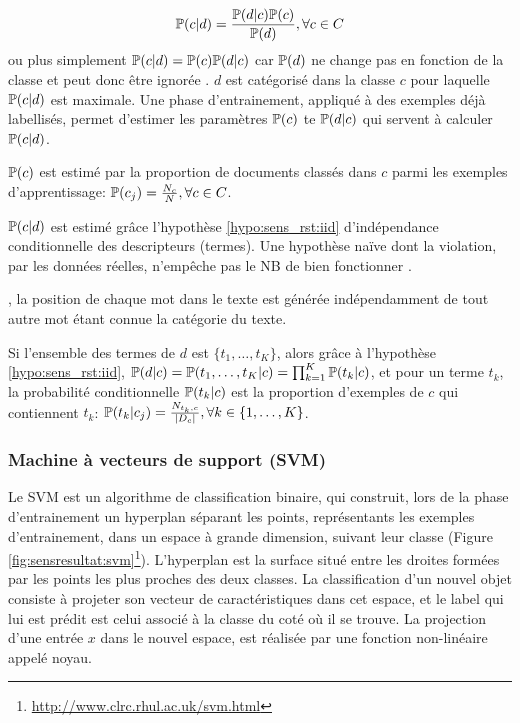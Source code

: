 \[\mathbb{P}(c \vert d) = \frac{\mathbb{P}(d \vert c)\mathbb{P}(c)}{\mathbb{P}(d)}, \forall c \in C \]
ou plus simplement  $\mathbb{P}(c \vert d) = \mathbb{P}(c)\mathbb{P}(d \vert c)$ car $\mathbb{P}(d)$ ne change pas en fonction de la classe et peut donc être ignorée \citep{rish2001nb_study}. $d$ est catégorisé dans la classe $c$ pour laquelle $\mathbb{P}(c \vert d)$ est maximale. Une phase d'entrainement, appliqué à des exemples déjà labellisés, permet d'estimer les paramètres $\mathbb{P}(c)$ te $\mathbb{P}(d \vert c)$ qui servent à calculer $\mathbb{P}(c \vert d)$.

$\mathbb{P}(c)$ est estimé par la proportion de documents classés dans $c$ parmi les exemples d'apprentissage: $\mathbb{P}(c_j) = \frac{N_c}{N}, \forall c \in C$.


 $\mathbb{P}(c \vert d)$ est estimé grâce l'hypothèse \ref{hypo:sens_rst:iid} d'{indépendance conditionnelle des descripteurs (termes)}. Une hypothèse naïve dont la violation, par les données réelles, n'empêche pas le NB de bien fonctionner \citep{rish2001nb_study}. 

\begin{hypothese}, la position de chaque mot dans le texte est générée indépendamment de tout autre mot étant connue la catégorie du texte. \label{hypo:sens_rst:iid}
\end{hypothese}

Si l'ensemble des termes de $d$ est $\lbrace t_{1}, \dots, t_{K} \rbrace$, alors grâce à l'hypothèse \ref{hypo:sens_rst:iid},
$\mathbb{P}(d \vert c) = \mathbb{P}(t_{1}, \dots, t_{K}\vert c) = \prod_{k=1}^K \mathbb{P}(t_{k} \vert c)$, et pour un terme $t_k$, la probabilité conditionnelle $\mathbb{P}(t_k \vert c)$ est la proportion d'exemples de $c$ qui contiennent $t_k$:  $\mathbb{P}(t_k \vert c_j) = \frac{N_{t_k,c}}{\vert D_c \vert }, \forall k \in \lbrace 1, \dots, K \rbrace$.

\subsubsection{Machine à vecteurs de support (SVM)}
Le SVM \citep{vapnik1995statlearning} est un algorithme de classification binaire, qui construit, lors de la phase d'entrainement un hyperplan séparant les points, représentants les exemples d'entrainement, dans un espace à grande dimension, suivant leur classe (Figure \ref{fig:sensresultat:svm}\footnote{\url{http://www.clrc.rhul.ac.uk/svm.html}}). L'hyperplan est la surface situé entre les droites formées par les points les plus proches des deux classes. La classification d'un nouvel objet consiste à projeter son vecteur de caractéristiques dans cet espace, et le label qui lui est prédit est celui associé à la classe du coté où il se trouve. La projection d'une entrée $x$ dans le nouvel espace, est réalisée par une fonction non-linéaire appelé noyau.

